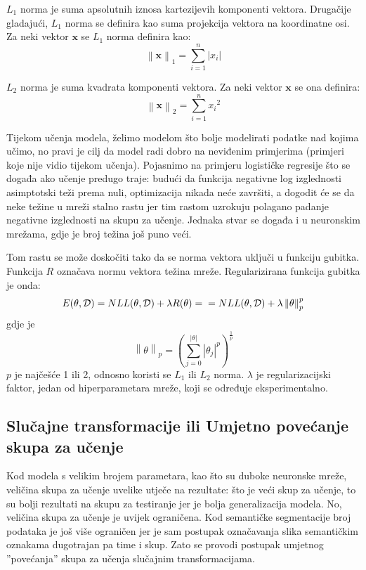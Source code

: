 \documentclass[times, utf8, diplomski, numeric]{fer}
\newcommand{\norm}[1]{\left\lVert#1\right\rVert}
\newcommand{\abs}[1]{\left\lvert#1\right\rvert}
\begin{document}
$L_1$ norma je suma apsolutnih iznosa kartezijevih komponenti vektora. Drugačije gladajući, $L_1$ norma se definira kao suma projekcija vektora na koordinatne osi. Za neki vektor $\boldsymbol{x}$ se $L_1$ norma definira kao:
\begin{equation}
\norm{\boldsymbol{x}}_1 = \sum_{i = 1}^{n} \abs{x_i}
\end{equation}

$L_2$ norma je suma kvadrata komponenti vektora. Za neki vektor $\boldsymbol{x}$ se ona definira:
\begin{equation}
\norm{\boldsymbol{x}}_2 = \sum_{i = 1}^{n} {x_i}^2
\end{equation}

Tijekom učenja modela, želimo modelom što bolje modelirati podatke nad kojima učimo, no pravi je cilj da model radi dobro na neviđenim primjerima (primjeri koje nije vidio tijekom učenja). Pojasnimo na primjeru logističke regresije što se događa ako učenje predugo traje: budući da funkcija negativne log izglednosti asimptotski teži prema nuli, optimizacija nikada neće završiti, a dogodit će se da neke težine u mreži stalno rastu jer tim rastom uzrokuju polagano padanje negativne izglednosti na skupu za učenje. Jednaka stvar se događa i u neuronskim mrežama, gdje je broj težina još puno veći.

Tom rastu se može doskočiti tako da se norma vektora uključi u funkciju gubitka. Funkcija $R$ označava normu vektora težina mreže. Regularizirana funkcija gubitka je onda:
\begin{equation}
    E(\theta, \mathcal{D}) = NLL(\theta, \mathcal{D}) + \lambda R(\theta) = \\
    = NLL(\theta, \mathcal{D}) + \lambda \norm{\theta}_p^p
\end{equation}
gdje je
\begin{equation}
    \norm{\theta}_p = (\sum_{j = 0}^{\abs{\theta}} \abs{\theta_j}^p)^{\frac{1}{p}}
\end{equation}
$p$ je najčešće 1 ili 2, odnosno koristi se $L_1$ ili $L_2$ norma. $\lambda$ je regularizacijski faktor, jedan od hiperparametara mreže, koji se određuje eksperimentalno.

\subsection{Slučajne transformacije ili Umjetno povećanje skupa za učenje}
\label{chap:dataset_perturbations}

Kod modela s velikim brojem parametara, kao što su duboke neuronske mreže, veličina skupa za učenje uvelike utječe na rezultate: što je veći skup za učenje, to su bolji rezultati na skupu za testiranje jer je bolja generalizacija modela. No, veličina skupa za učenje je uvijek ograničena. Kod semantičke segmentacije broj podataka je još više ograničen jer je sam postupak označavanja slika semantičkim oznakama dugotrajan pa time i skup.
Zato se provodi postupak umjetnog ''povećanja'' skupa za učenja slučajnim transformacijama.
\end{document}
